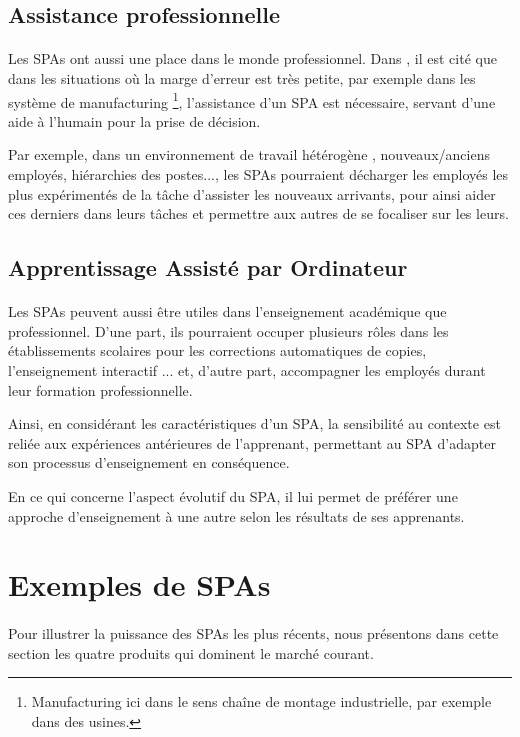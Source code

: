 \subsection{Assistance professionnelle}
\paragraph{}
Les SPAs ont aussi une place dans le monde professionnel. Dans \citep{Imtiaz2014}, il est cité que dans les situations où la marge d'erreur est très petite, par exemple dans les système de manufacturing \footnote{Manufacturing ici dans le sens chaîne de montage industrielle, par exemple dans des usines.}, l'assistance d'un SPA est nécessaire, servant d'une aide à l'humain pour la prise de décision.
\par
Par exemple, dans un environnement de travail hétérogène , nouveaux/anciens employés, hiérarchies des postes..., les SPAs pourraient décharger les employés les plus expérimentés de la tâche d'assister les nouveaux arrivants, pour ainsi aider ces derniers dans leurs tâches et permettre aux autres de se focaliser sur les leurs.

\subsection{Apprentissage Assisté par Ordinateur}
\paragraph{}
Les SPAs peuvent aussi être utiles dans l'enseignement académique que professionnel. D'une part, ils pourraient occuper plusieurs rôles dans les établissements scolaires pour les corrections automatiques de copies, l'enseignement interactif ... \citep{ENGAGINGTA} et, d'autre part, accompagner les employés durant leur formation professionnelle.
\par
Ainsi, en considérant les caractéristiques d'un SPA, la sensibilité au contexte est reliée aux expériences antérieures de l'apprenant, permettant au SPA d'adapter son processus d'enseignement en conséquence.
\par 
En ce qui concerne l'aspect évolutif du SPA, il lui permet de préférer une approche d'enseignement à une autre selon les résultats de ses apprenants.

\section{Exemples de SPAs}
\paragraph{}
Pour illustrer la puissance des SPAs les plus récents, nous présentons dans cette section les quatre produits qui dominent le marché courant.

